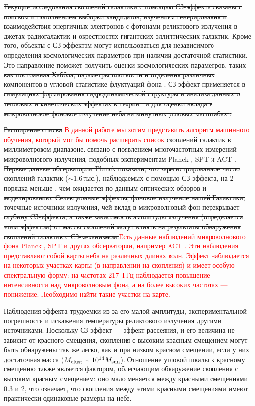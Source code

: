 \documentclass[
aps,%
12pt,%
final,%
notitlepage,%
oneside,%
onecolumn,%
nobibnotes,%
nofootinbib,%
superscriptaddress,%
noshowpacs,%
centertags]%
{revtex4}
\begin{document}
\sout{Текущие исследования скоплений галактики с помощью СЗ-эффекта связаны с поиском и пополнением выборки кандидатов, изучением генерирования и взаимодействия энергичных электронов с фотонами реликтового излучения в джетах радиогалактик и окрестностях гигантских эллиптических галактик. Кроме того, объекты с СЗ-эффектом могут использоваться для независимого определения космологических параметров при наличии достаточной статистики. Это направление поможет получить оценки космологических параметров, таких как постоянная Хаббла, параметры плотности и отделения различных компонентов в угловой статистике флуктуаций фона \cite{Barbosa1996,planck_zs}. СЗ-эффект применяется в симуляциях формирования гидродинамической структуры и анализа данных о тепловых и кинетических эффектах в теории~\cite{2009MNRAS.397L..41C} и для оценки вклада в микроволновое фоновое излучение неба на минутных угловых масштабах \cite{dsol_model}. }

\sout{Расширение списка} \textcolor{red}{В данной работе мы хотим представить алгоритм машинного обучения, который мог бы помочь расширить список} скоплений галактик в миллиметровом диапазоне. \sout{связано с появлением многочастотных измерений микроволнового излучения, подобных экспериментам Planck \cite{planck_zs}, SPT \cite{spt_zs} и ACT \cite{act_zs}. Первые данные обсерватории Planck показали, что зарегистрированное число скоплений галактик ($\sim$1.6\,тыс.), наблюдаемых с помощью СЗ-эффекта, на 2 порядка меньше \cite{Planck1, Planck2}, чем ожидается по данным оптических обзоров и моделированию. Селекционные эффекты, фоновое излучение нашей Галактики, точечные источники излучения, чей вклад в микроволновый фон перекрывает глубину CЗ-эффекта, а также зависимость амплитуды излучения (определяется этим эффектом) от массы скоплений могут влиять на результаты обнаружения скоплений галактик с СЗ-механизмом.}\textcolor{red}{Есть данные наблюдений микроволнового фона Planck \cite{planck_zs}, SPT \cite{spt_zs} и  других обсерваторий, например ACT \cite{act_zs}. Эти наблюдения представляют собой карты неба на различных длинах волн. Эффект наблюдается на некоторых участках карты (в направлении на скопления) и имеет особую спектральную форму: на частотах 217~ГГц наблюдается повышение интенсивности над микроволновым фона, а на более высоких частотах --- понижение. Необходимо найти такие участки на карте.}

Наблюдения эффекта трудоемки из-за его малой амплитуды, экспериментальной погрешности и искажения температуры реликтового излучения другими источниками. Поскольку СЗ-эффект --- эффект рассеяния, и его величина не зависит от красного смещения, скопления с высоким красным смещением могут быть обнаружены так же легко, как и при низком красном смещении, если у них достаточная масса ($M_{\rm clust}\sim10^{14} M_{\rm sun} $).
Отношение угловой шкалы к красному смещению также является фактором, облегчающим обнаружение скопления с высоким красным смещением: оно мало меняется между красными смещениями 0.3 и 2, что означает, что скопления между этими красными смещениями имеют практически одинаковые размеры на небе.
\end{document}
